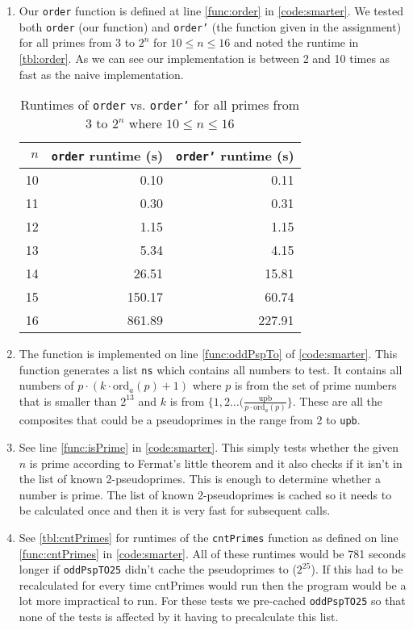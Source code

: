 \documentclass[a4paper]{article}
\begin{document}
\begin{enumerate}
	\item Our \texttt{order} function is defined at line \autoref{func:order} in \autoref{code:smarter}. We tested both \texttt{order} (our function) and \texttt{order'} (the function given in the assignment) for all primes from 3 to $2^n$ for $10 \leq n \leq 16$  and noted the runtime in \autoref{tbl:order}. As we can see our implementation is between 2 and 10 times as fast as the naive implementation.
	
\begin{table}[h]
	\centering
	\caption{Runtimes of \texttt{order} vs. \texttt{order'} for all primes from 3 to $2^n$ where $10 \leq n \leq 16$}
	\label{tbl:order}
	\begin{tabular}{r|r|r}
		$n$ & \texttt{order} runtime (s) & \texttt{order'} runtime (s) \\
		\hline
		10 & 0.10 & 0.11 \\
		11 & 0.30 & 0.31 \\
		12 & 1.15 & 1.15 \\
		13 & 5.34 & 4.15 \\
		14 & 26.51 & 15.81 \\
		15 & 150.17 & 60.74 \\
		16 & 861.89 & 227.91
	\end{tabular}
\end{table}
	\item The function is implemented on line \autoref{func:oddPspTo} of \autoref{code:smarter}. This function generates a list \texttt{ns} which contains all numbers to test. It contains all numbers of $p \cdot (k \cdot \text{ord}_a(p) +1)$ where $p$ is from the set of prime numbers that is smaller than $2^13$ and $k$ is from $\{1, 2 \ldots (\frac{\text{upb}}{p \cdot \text{ord}_a(p)} \}$. These are all the composites that could be a pseudoprimes in the range from 2 to \texttt{upb}.
	\item See line \autoref{func:isPrime} in \autoref{code:smarter}. This simply tests whether the given $n$ is prime according to Fermat's little theorem and it also checks if it isn't in the list of known 2-pseudoprimes. This is enough to determine whether a number is prime. The list of known 2-pseudoprimes is cached so it needs to be calculated once and then it is very fast for subsequent calls.
	\item See \autoref{tbl:cntPrimes} for runtimes of the \texttt{cntPrimes} function as defined on line \autoref{func:cntPrimes} in \autoref{code:smarter}. All of these runtimes would be 781 seconds longer if \texttt{oddPspTO25} didn't cache the pseudoprimes to ($2^25$). If this had to be recalculated for every time cntPrimes would run then the program would be a lot more impractical to run. For these tests we pre-cached \texttt{oddPspTO25} so that none of the tests is affected by it having to precalculate this list.


\end{enumerate}
\end{document}

